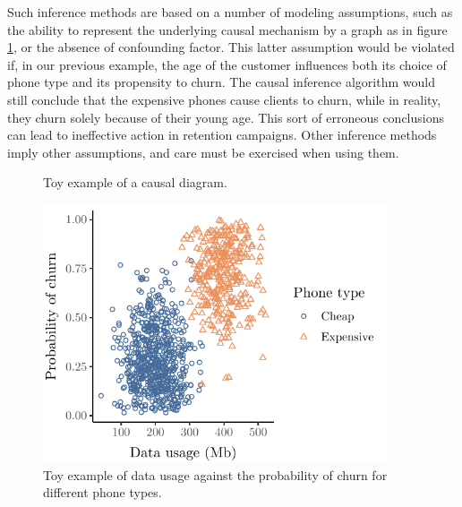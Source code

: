 Such inference methods are based on a number of modeling assumptions, such as
the ability to represent the underlying causal mechanism by a graph as in figure
\ref{fig:simple_causal}, or the absence of confounding factor. This latter
assumption would be violated if, in our previous example, the age of the
customer influences both its choice of phone type and its propensity  to churn.
The causal inference algorithm would still conclude that the expensive phones
cause clients to churn, while in reality, they churn solely because of their
young age. This sort of erroneous conclusions can lead to ineffective action in
retention campaigns. Other inference methods imply other assumptions, and care
must be exercised when using them.

\begin{figure}
    \centering
    \caption{Toy example of a causal diagram.}
    \label{fig:simple_causal}
\end{figure}

\begin{figure}
    \centering
    \includegraphics[width=4in]{figures/simple_causal_plot.pdf}
    \caption{Toy example of data usage against the probability of churn for
    different phone types.}
    \label{fig:simple_causal_plot}
\end{figure}

